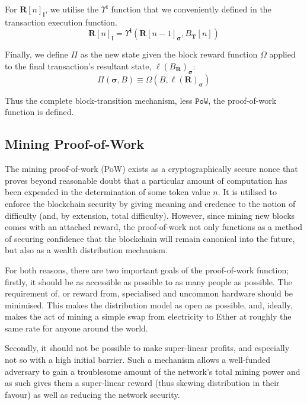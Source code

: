 \documentclass[9pt,oneside]{amsart}
\begin{document}
\begin{multicols}{2}
For $\mathbf{R}[n]_\mathbf{l}$, we utilise the $\Upsilon^\mathbf{l}$ function that we conveniently defined in the transaction execution function.
\begin{equation}
\mathbf{R}[n]_\mathbf{l} = 
\Upsilon^\mathbf{l}(\mathbf{R}[n - 1]_{\boldsymbol{\sigma}}, B_\mathbf{T}[n])
\end{equation}

Finally, we define $\Pi$ as the new state given the block reward function $\Omega$ applied to the final transaction's resultant state, $\ell(B_\mathbf{R})_{\boldsymbol{\sigma}}$:
\begin{equation}
\Pi(\boldsymbol{\sigma}, B) \equiv \Omega(B, \ell(\mathbf{R})_{\boldsymbol{\sigma}})
\end{equation}

Thus the complete block-transition mechanism, less $\mathtt{PoW}$, the proof-of-work function is defined.

\subsection{Mining Proof-of-Work} \label{ch:pow}

The mining proof-of-work (PoW) exists as a cryptographically secure nonce that proves beyond reasonable doubt that a particular amount of computation has been expended in the determination of some token value $n$. It is utilised to enforce the blockchain security by giving meaning and credence to the notion of difficulty (and, by extension, total difficulty). However, since mining new blocks comes with an attached reward, the proof-of-work not only functions as a method of securing confidence that the blockchain will remain canonical into the future, but also as a wealth distribution mechanism.

For both reasons, there are two important goals of the proof-of-work function; firstly, it should be as accessible as possible to as many people as possible. The requirement of, or reward from, specialised and uncommon hardware should be minimised. This makes the distribution model as open as possible, and, ideally, makes the act of mining a simple swap from electricity to Ether at roughly the same rate for anyone around the world.

Secondly, it should not be possible to make super-linear profits, and especially not so with a high initial barrier. Such a mechanism allows a well-funded adversary to gain a troublesome amount of the network's total mining power and as such gives them a super-linear reward (thus skewing distribution in their favour) as well as reducing the network security.


\end{multicols}
\end{document}
